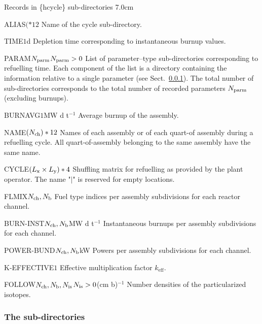 \begin{DescriptionEnregistrement}{Records in \{hcycle\} sub-directories}
{7.0cm} \label{tabl:tabhcycle}

\CharEnr
 {ALIAS}{$(*12$}
 {Name of the cycle sub-directory.}

\RealEnr
 {TIME}{$1$}{d}
 {Depletion time corresponding to instantaneous burnup values.}

\OptDirlEnr
  {PARAM}{$N_{\rm parm}$}{$N_{\rm parm}>0$}
  {List of parameter--type sub-directories corresponding to refuelling time. Each component of the list is a directory
   containing the information relative to a single parameter (see Sect.~\ref{sect:dirparam}). The total number of sub-directories
   corresponds to the total number of recorded parameters $N_{\rm parm}$ (excluding  burnups).}

\RealEnr
 {BURNAVG}{$1$}{MW d t$^{-1}$}
 {Average burnup of the assembly.}

\CharEnr
 {NAME}{$(N_{\rm ch})*12$}
 {Names of each assembly or of each quart-of assembly during a refuelling cycle. All
 quart-of-assembly belonging to the same assembly have the same name.}

\CharEnr
 {CYCLE}{$(L_{\rm x}\times L_{\rm y})*4$}
 {Shuffling matrix for refuelling as provided by the plant operator. The name "$|$"
 is reserved for empty locations.}

\IntEnr
 {FLMIX}{$N_{\rm ch}, N_{\rm b}$}
 {Fuel type indices per assembly subdivisions for each reactor channel.}

\RealEnr
 {BURN-INST}{$N_{\rm ch}, N_{\rm b}$}{MW d t$^{-1}$}
 {Instantaneous burnups per assembly subdivisions for each channel.}

\RealEnr
 {POWER-BUND}{$N_{\rm ch}, N_{\rm b}$}{kW}
 {Powers per assembly subdivisions for each channel.}

\RealEnr
 {K-EFFECTIVE}{$1$}{}
 {Effective multiplication factor $k_{\mathrm{eff}}$.}

\OptRealEnr
 {FOLLOW}{$N_{\rm ch}, N_{\rm b}, N_{\rm is}$}{$N_{\rm is}>0$}{(cm b)$^{-1}$}
 {Number densities of the particularized isotopes.}

\end{DescriptionEnregistrement}

\clearpage

\subsubsection{The  sub-directories}\label{sect:dirparam}

